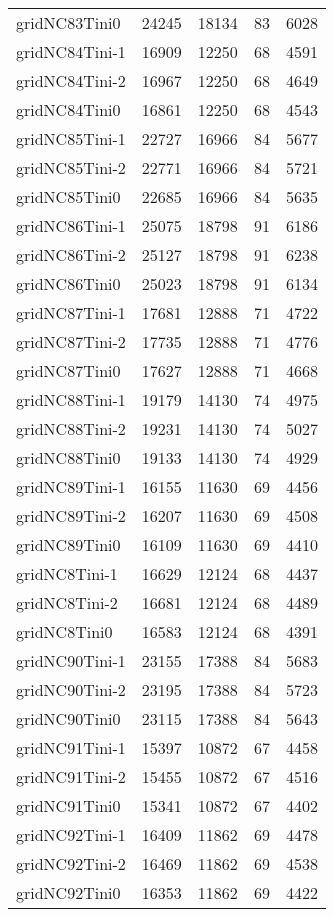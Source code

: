 \begin{longtable}{lrrrr}
gridNC83Tini0 & 24245 & 18134 & 83 & 6028 \\
gridNC84Tini-1 & 16909 & 12250 & 68 & 4591 \\
gridNC84Tini-2 & 16967 & 12250 & 68 & 4649 \\
gridNC84Tini0 & 16861 & 12250 & 68 & 4543 \\
gridNC85Tini-1 & 22727 & 16966 & 84 & 5677 \\
gridNC85Tini-2 & 22771 & 16966 & 84 & 5721 \\
gridNC85Tini0 & 22685 & 16966 & 84 & 5635 \\
gridNC86Tini-1 & 25075 & 18798 & 91 & 6186 \\
gridNC86Tini-2 & 25127 & 18798 & 91 & 6238 \\
gridNC86Tini0 & 25023 & 18798 & 91 & 6134 \\
gridNC87Tini-1 & 17681 & 12888 & 71 & 4722 \\
gridNC87Tini-2 & 17735 & 12888 & 71 & 4776 \\
gridNC87Tini0 & 17627 & 12888 & 71 & 4668 \\
gridNC88Tini-1 & 19179 & 14130 & 74 & 4975 \\
gridNC88Tini-2 & 19231 & 14130 & 74 & 5027 \\
gridNC88Tini0 & 19133 & 14130 & 74 & 4929 \\
gridNC89Tini-1 & 16155 & 11630 & 69 & 4456 \\
gridNC89Tini-2 & 16207 & 11630 & 69 & 4508 \\
gridNC89Tini0 & 16109 & 11630 & 69 & 4410 \\
gridNC8Tini-1 & 16629 & 12124 & 68 & 4437 \\
gridNC8Tini-2 & 16681 & 12124 & 68 & 4489 \\
gridNC8Tini0 & 16583 & 12124 & 68 & 4391 \\
gridNC90Tini-1 & 23155 & 17388 & 84 & 5683 \\
gridNC90Tini-2 & 23195 & 17388 & 84 & 5723 \\
gridNC90Tini0 & 23115 & 17388 & 84 & 5643 \\
gridNC91Tini-1 & 15397 & 10872 & 67 & 4458 \\
gridNC91Tini-2 & 15455 & 10872 & 67 & 4516 \\
gridNC91Tini0 & 15341 & 10872 & 67 & 4402 \\
gridNC92Tini-1 & 16409 & 11862 & 69 & 4478 \\
gridNC92Tini-2 & 16469 & 11862 & 69 & 4538 \\
gridNC92Tini0 & 16353 & 11862 & 69 & 4422 \\

\end{longtable}
